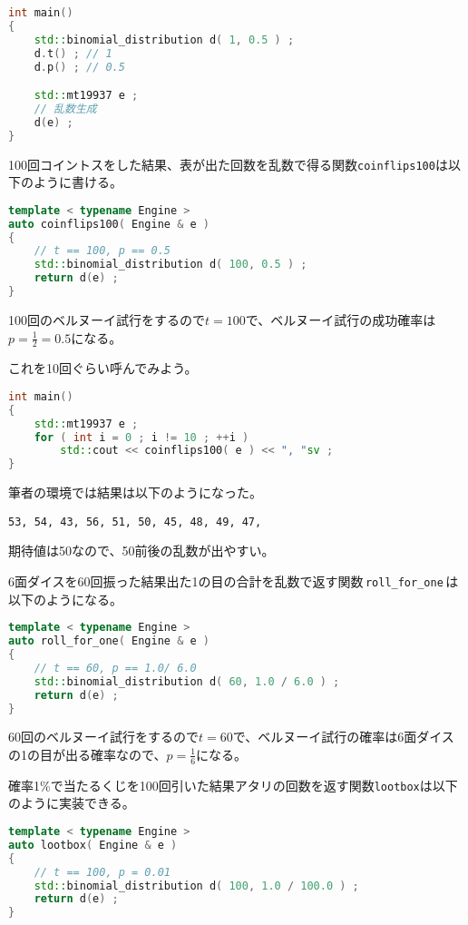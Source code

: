 \begin{lstlisting}[language={C++}]
int main()
{
    std::binomial_distribution d( 1, 0.5 ) ;
    d.t() ; // 1
    d.p() ; // 0.5

    std::mt19937 e ;
    // 乱数生成
    d(e) ;
}
\end{lstlisting}

\ifTombow\pagebreak\fi
100回コイントスをした結果、表が出た回数を乱数で得る関数\texttt{coinflips100}は以下のように書ける。

\begin{lstlisting}[language={C++}]
template < typename Engine >
auto coinflips100( Engine & e )
{
    // t == 100, p == 0.5
    std::binomial_distribution d( 100, 0.5 ) ;
    return d(e) ;
}
\end{lstlisting}

100回のベルヌーイ試行をするので\(t=100\)で、ベルヌーイ試行の成功確率は\(p=\frac{1}{2}=0.5\)になる。

これを10回ぐらい呼んでみよう。

\begin{lstlisting}[language={C++}]
int main()
{
    std::mt19937 e ;
    for ( int i = 0 ; i != 10 ; ++i )
        std::cout << coinflips100( e ) << ", "sv ;
}
\end{lstlisting}

筆者の環境では結果は以下のようになった。

\begin{lstlisting}[style=terminal]
53, 54, 43, 56, 51, 50, 45, 48, 49, 47, 
\end{lstlisting}

期待値は50なので、50前後の乱数が出やすい。

6面ダイスを60回振った結果出た1の目の合計を乱数で返す関数\,\texttt{roll\_for\_one}\,は以下のようになる。

\begin{lstlisting}[language={C++}]
template < typename Engine >
auto roll_for_one( Engine & e )
{
    // t == 60, p == 1.0/ 6.0
    std::binomial_distribution d( 60, 1.0 / 6.0 ) ;
    return d(e) ;
}
\end{lstlisting}

60回のベルヌーイ試行をするので\(t=60\)で、ベルヌーイ試行の確率は6面ダイスの1の目が出る確率なので、\(p=\frac{1}{6}\)になる。

確率1\%で当たるくじを100回引いた結果アタリの回数を返す関数\texttt{lootbox}は以下のように実装できる。

\ifTombow\pagebreak\fi
\begin{lstlisting}[language={C++}]
template < typename Engine >
auto lootbox( Engine & e )
{
    // t == 100, p = 0.01
    std::binomial_distribution d( 100, 1.0 / 100.0 ) ;
    return d(e) ;
}
\end{lstlisting}

